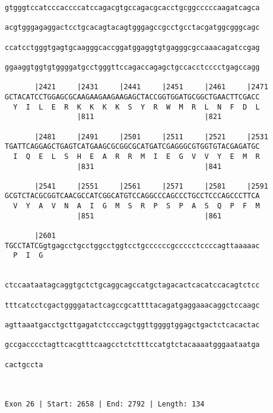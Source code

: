 \documentclass{article}
\begin{document}
\begin{Verbatim}
gtgggtccatcccaccccatccagacgtgccagacgcacctgcggcccccaagatcagca
                                                            
acgtgggagaggactcctgcacagtacagtgggagccgcctgcctacgatggcgggcagc
                                                            
ccatcctgggtgagtgcaagggcaccggatggaggtgtgagggcgccaaacagatccgag
                                                            
ggaaggtggtgtggggatgcctgggttccagaccagagctgccacctcccctgagccagg
                                                            
       |2421     |2431     |2441     |2451     |2461     |2471
GCTACATCCTGGAGCGCAAGAAGAAGAAGAGCTACCGGTGGATGCGGCTGAACTTCGACC
  Y  I  L  E  R  K  K  K  K  S  Y  R  W  M  R  L  N  F  D  L
                 |811                          |821         
  
       |2481     |2491     |2501     |2511     |2521     |2531
TGATTCAGGAGCTGAGTCATGAAGCGCGGCGCATGATCGAGGGCGTGGTGTACGAGATGC
  I  Q  E  L  S  H  E  A  R  R  M  I  E  G  V  V  Y  E  M  R
                 |831                          |841         
  
       |2541     |2551     |2561     |2571     |2581     |2591
GCGTCTACGCGGTCAACGCCATCGGCATGTCCAGGCCCAGCCCTGCCTCCCAGCCCTTCA
  V  Y  A  V  N  A  I  G  M  S  R  P  S  P  A  S  Q  P  F  M
                 |851                          |861         
  
       |2601                                                
TGCCTATCGgtgagcctgcctggcctggtcctgccccccgccccctccccagttaaaaac
  P  I  G                                                   
                                                            
  
ctccaataatagcaggtgctctgcaggcagccatgctagacactcacatccacagtctcc
                                                            
tttcatcctcgactggggatactcagccgcattttacagatgaggaaacaggctccaagc
                                                            
agttaaatgacctgcttgagatctcccagctggttggggtggagctgactctcacactac
                                                            
gccgacccctagttcacgtttcaagcctctctttccatgtctacaaaatgggaataatga
                                                            
cactgccta
         
         
 
Exon 26 | Start: 2658 | End: 2792 | Length: 134



\end{Verbatim}
\end{document}
